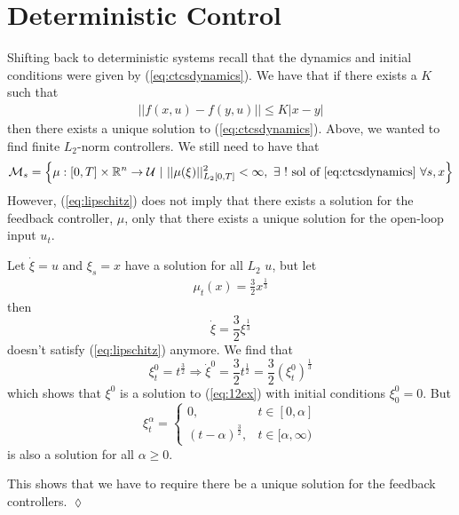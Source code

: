 \section{Deterministic Control}
Shifting back to deterministic systems recall that the dynamics and initial conditions were given by (\ref{eq:ctcsdynamics}). We have that if there exists a $K$ such that
\begin{align}
\label{eq:lipschitz}
||f(x,u)-f(y,u)||\leq K|x-y|
\end{align}
then there exists a unique solution to (\ref{eq:ctcsdynamics}). Above, we wanted to find finite $L_2$-norm controllers. We still need to have that
\begin{align}
\label{eq:controlspace}
\mathcal{M}_s = \left\lbrace \mu:[0,T]\times\mathbb{R}^n\to\mathcal{U} ~|~ ||\mu(\xi)||^2_{L_2[0,T]}<\infty, ~\exists~ ! \text{ sol of \ref{eq:ctcsdynamics} } \forall s,x \right\rbrace
\end{align}
However, (\ref{eq:lipschitz}) does not imply that there exists a solution for the feedback controller, $\mu$, only that there exists a unique solution for the open-loop input $u_t$.

\begin{example}
Let $\dot{\xi}=u$ and $\xi_s=x$ have a solution for all $L_2$ $u$, but let
\begin{align}
\label{eq:12ex}
\mu_t(x)=\frac{3}{2}x^{\frac{1}{3}}
\end{align}
then
$$\dot{\xi}=\frac{3}{2}\xi^{\frac{1}{3}}$$
doesn't satisfy (\ref{eq:lipschitz}) anymore. We find that
$$\xi_t^0=t^{\frac{3}{2}} \Rightarrow \dot{\xi}^0=\frac{3}{2}t^{\frac{1}{2}} = \frac{3}{2}(\xi_t^0)^{\frac{1}{3}}$$
which shows that $\xi^0$ is a solution to (\ref{eq:12ex}) with initial conditions $\xi_0^0=0$. But
$$\xi_t^\alpha = \begin{cases} 0, & t\in[0,\alpha] \\ (t-\alpha)^{\frac{3}{2}}, & t\in[\alpha,\infty) \end{cases}$$
is also a solution for all $\alpha\geq0$.

This shows that we have to require there be a unique solution for the feedback controllers.
$\lozenge$
\end{example}

